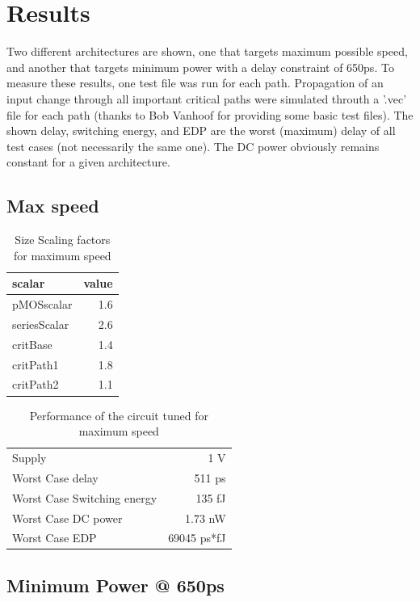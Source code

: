 \documentclass[english]{article}
\begin{document}
\section{Results}
Two different architectures are shown, one that targets maximum possible speed, and another that targets minimum power with a delay constraint of 650ps.
To measure these results, one test file was run for each path. Propagation of an input change through all important critical paths were simulated throuth a '.vec' file for each path (thanks to Bob Vanhoof for providing some basic test files). 
The shown delay, switching energy, and EDP are the worst (maximum) delay of all test cases (not necessarily the same one). The DC power obviously remains constant for a given architecture.

\subsection{Max speed}
\begin{table}[h]
\centering
\begin{tabular}{ |l|r| }
\hline
scalar	& value \\
\hline
 pMOSscalar		& 1.6 \\
 seriesScalar   & 2.6 \\
 critBase   	& 1.4 \\
 critPath1   	& 1.8 \\
 critPath2    	& 1.1 \\
\hline
\end{tabular}
\caption{Size Scaling factors for maximum speed}
\label{SpeedScalars}
\end{table}

\begin{table}[h]
\centering
\begin{tabular}{ |l|r| }
\hline
Supply	&	1 V \\
Worst Case delay &            511 ps  \\
Worst Case Switching energy & 135 fJ \\
Worst Case DC power &        1.73 nW  \\
Worst Case EDP &              69045 ps*fJ \\
\hline
\end{tabular}
\caption{Performance of the circuit tuned for maximum speed}
\label{SpeedPerformance}
\end{table}

\subsection{Minimum Power @ 650ps}
\end{document}

